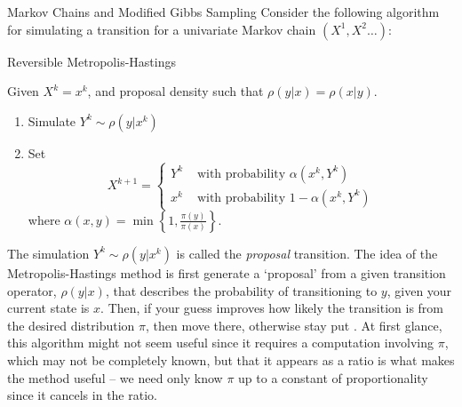 \begin{chapter}{Markov Chains and Modified Gibbs Sampling}
Consider the following algorithm for simulating a transition for a univariate Markov chain $(X^1,X^2\dots)$:
\begin{algorithm}[H]
\caption{Reversible Metropolis-Hastings} \label{alg:metropolis}
Given $X^k = x^{k}$, and proposal density such that $\rho(y|x) = \rho(x|y)$.
\begin{enumerate}[1.]
  \item Simulate $Y^k \sim \rho(y|x^k)$
  \item Set
  \begin{equation*}
    X^{k+1} = \begin{cases}
      Y^k &\text{ with probability } \alpha(x^{k},Y^k) \\
      x^k &\text{ with probability } 1-\alpha(x^{k},Y^k)
    \end{cases} 
  \end{equation*}
  where $\displaystyle{\alpha(x,y) = \min\left\{1,\frac{\pi(y)}{\pi(x)}\right\}.}$ 
\end{enumerate}
\end{algorithm} 

The simulation $Y^k\sim \rho(y|x^k)$ is called the \emph{proposal} transition.
The idea of the Metropolis-Hastings method is first generate a `proposal' from a given transition operator, $\rho(y|x)$, that describes the probability of transitioning to $y$, given your current state is $x$. 
Then, if your guess improves how likely the transition is from the desired distribution $\pi$, then move there, otherwise stay put \citep{calvetti2007introduction}.
At first glance, this algorithm might not seem useful since it requires a computation involving $\pi$, which may not be completely known, but that it appears as a ratio is what makes the method useful -- we need only know $\pi$ up to a constant of proportionality since it cancels in the ratio.


\end{chapter}
